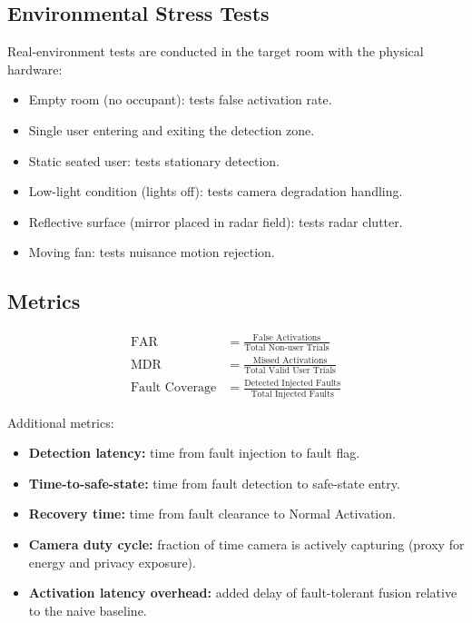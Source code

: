 \documentclass[12pt]{extarticle}
\begin{document}
\subsection{Environmental Stress Tests}

Real-environment tests are conducted in the target room with the physical hardware:

\begin{itemize}
  \item Empty room (no occupant): tests false activation rate.
  \item Single user entering and exiting the detection zone.
  \item Static seated user: tests stationary detection.
  \item Low-light condition (lights off): tests camera degradation handling.
  \item Reflective surface (mirror placed in radar field): tests radar clutter.
  \item Moving fan: tests nuisance motion rejection.
\end{itemize}

\subsection{Metrics}

\begin{align}
  \text{FAR} &= \frac{\text{False Activations}}{\text{Total Non-user Trials}}
  \label{eq:far}\\[4pt]
  \text{MDR} &= \frac{\text{Missed Activations}}{\text{Total Valid User Trials}}
  \label{eq:mdr}\\[4pt]
  \text{Fault Coverage} &= \frac{\text{Detected Injected Faults}}{\text{Total Injected Faults}}
  \label{eq:fc}
\end{align}

Additional metrics:
\begin{itemize}
  \item \textbf{Detection latency:} time from fault injection to fault flag.
  \item \textbf{Time-to-safe-state:} time from fault detection to safe-state entry.
  \item \textbf{Recovery time:} time from fault clearance to Normal Activation.
  \item \textbf{Camera duty cycle:} fraction of time camera is actively capturing
        (proxy for energy and privacy exposure).
  \item \textbf{Activation latency overhead:} added delay of fault-tolerant fusion
        relative to the naive baseline.
\end{itemize}
\end{document}
